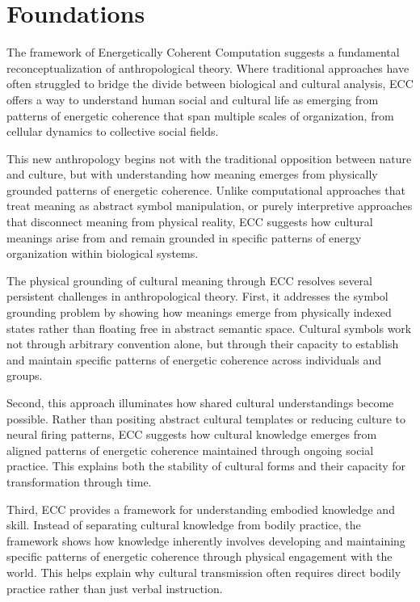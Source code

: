 \section{Foundations}

The framework of Energetically Coherent Computation suggests a fundamental reconceptualization of anthropological theory. Where traditional approaches have often struggled to bridge the divide between biological and cultural analysis, ECC offers a way to understand human social and cultural life as emerging from patterns of energetic coherence that span multiple scales of organization, from cellular dynamics to collective social fields.

This new anthropology begins not with the traditional opposition between nature and culture, but with understanding how meaning emerges from physically grounded patterns of energetic coherence. Unlike computational approaches that treat meaning as abstract symbol manipulation, or purely interpretive approaches that disconnect meaning from physical reality, ECC suggests how cultural meanings arise from and remain grounded in specific patterns of energy organization within biological systems.

The physical grounding of cultural meaning through ECC resolves several persistent challenges in anthropological theory. First, it addresses the symbol grounding problem by showing how meanings emerge from physically indexed states rather than floating free in abstract semantic space. Cultural symbols work not through arbitrary convention alone, but through their capacity to establish and maintain specific patterns of energetic coherence across individuals and groups.

Second, this approach illuminates how shared cultural understandings become possible. Rather than positing abstract cultural templates or reducing culture to neural firing patterns, ECC suggests how cultural knowledge emerges from aligned patterns of energetic coherence maintained through ongoing social practice. This explains both the stability of cultural forms and their capacity for transformation through time.

Third, ECC provides a framework for understanding embodied knowledge and skill. Instead of separating cultural knowledge from bodily practice, the framework shows how knowledge inherently involves developing and maintaining specific patterns of energetic coherence through physical engagement with the world. This helps explain why cultural transmission often requires direct bodily practice rather than just verbal instruction.

